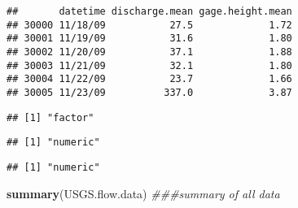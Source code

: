 \documentclass[]{article}
\newenvironment{Shaded}{\begin{snugshade}}{\end{snugshade}}
\newcommand{\CommentTok}[1]{\textcolor[rgb]{0.56,0.35,0.01}{\textit{#1}}}
\newcommand{\KeywordTok}[1]{\textcolor[rgb]{0.13,0.29,0.53}{\textbf{#1}}}
\newcommand{\NormalTok}[1]{#1}
\newcommand{\OperatorTok}[1]{\textcolor[rgb]{0.81,0.36,0.00}{\textbf{#1}}}
\begin{document}
\begin{verbatim}
##       datetime discharge.mean gage.height.mean
## 30000 11/18/09           27.5             1.72
## 30001 11/19/09           31.6             1.80
## 30002 11/20/09           37.1             1.88
## 30003 11/21/09           32.1             1.80
## 30004 11/22/09           23.7             1.66
## 30005 11/23/09          337.0             3.87
\end{verbatim}

\begin{Shaded}
\end{Shaded}

\begin{verbatim}
## [1] "factor"
\end{verbatim}

\begin{Shaded}
\end{Shaded}

\begin{verbatim}
## [1] "numeric"
\end{verbatim}

\begin{Shaded}
\end{Shaded}

\begin{verbatim}
## [1] "numeric"
\end{verbatim}

\begin{Shaded}
\begin{Highlighting}[]
\KeywordTok{summary}\NormalTok{(USGS.flow.data) }\CommentTok{###summary of all data}
\end{Highlighting}
\end{Shaded}
\end{document}
